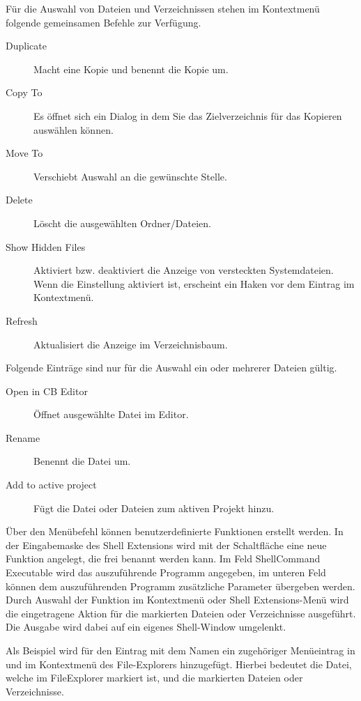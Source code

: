 Für die Auswahl von Dateien und Verzeichnissen stehen im Kontextmenü folgende gemeinsamen Befehle zur Verfügung.

\begin{description}
\item[Duplicate] Macht eine Kopie und benennt die Kopie um.
\item[Copy To] Es öffnet sich ein Dialog in dem Sie das Zielverzeichnis für das Kopieren auswählen können.
\item[Move To] Verschiebt Auswahl an die gewünschte Stelle.
\item[Delete] Löscht die ausgewählten Ordner/Dateien.
\item[Show Hidden Files] Aktiviert bzw. deaktiviert die Anzeige von versteckten Systemdateien. Wenn die Einstellung aktiviert ist, erscheint ein Haken vor dem Eintrag im Kontextmenü.
\item[Refresh] Aktualisiert die Anzeige im Verzeichnisbaum.
\end{description}

Folgende Einträge sind nur für die Auswahl ein oder mehrerer Dateien gültig.

\begin{description}
\item[Open in CB Editor] Öffnet ausgewählte Datei im \codeblocks Editor.
\item[Rename] Benennt die Datei um.
\item[Add to active project] Fügt die Datei oder Dateien zum aktiven Projekt hinzu.
\end{description}


Über den Menübefehl  können benutzerdefinierte Funktionen erstellt werden. In der Eingabemaske des Shell Extensions wird mit der Schaltfläche  eine neue Funktion angelegt, die frei benannt werden kann. Im Feld ShellCommand Executable wird das auszuführende Programm angegeben, im unteren Feld können dem auszuführenden Programm zusätzliche Parameter übergeben werden.
Durch Auswahl der Funktion im Kontextmenü oder Shell Extensions-Menü wird die eingetragene Aktion für die markierten Dateien oder Verzeichnisse ausgeführt. Die Ausgabe wird dabei auf ein eigenes Shell-Window umgelenkt.

Als Beispiel wird für den Eintrag mit dem Namen  ein zugehöriger Menüeintrag in  und im Kontextmenü des File-Explorers hinzugefügt. Hierbei bedeutet  die Datei, welche im FileExplorer markiert ist, und  die markierten Dateien oder Verzeichnisse.

